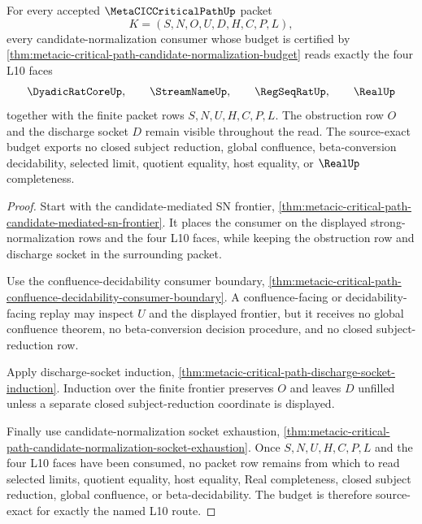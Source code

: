 \begin{theorem}
\label{thm:metacic-critical-path-candidate-normalization-l10-source-exactness}
For every accepted $\MetaCICCriticalPathUp$ packet
$$
K=(S,N,O,U,D,H,C,P,L),
$$
every candidate-normalization consumer whose budget is certified by \autoref{thm:metacic-critical-path-candidate-normalization-budget} reads exactly the four L10 faces
$$
\DyadicRatCoreUp,\qquad
\StreamNameUp,\qquad
\RegSeqRatUp,\qquad
\RealUp
$$
together with the finite packet rows $S,N,U,H,C,P,L$. The obstruction row $O$ and the discharge socket $D$ remain visible throughout the read. The source-exact budget exports no closed subject reduction, global confluence, beta-conversion decidability, selected limit, quotient equality, host equality, or $\RealUp$ completeness.
\end{theorem}
\begin{proof}
Start with the candidate-mediated SN frontier, \autoref{thm:metacic-critical-path-candidate-mediated-sn-frontier}. It places the consumer on the displayed strong-normalization rows and the four L10 faces, while keeping the obstruction row and discharge socket in the surrounding packet.

Use the confluence-decidability consumer boundary, \autoref{thm:metacic-critical-path-confluence-decidability-consumer-boundary}. A confluence-facing or decidability-facing replay may inspect $U$ and the displayed frontier, but it receives no global confluence theorem, no beta-conversion decision procedure, and no closed subject-reduction row.

Apply discharge-socket induction, \autoref{thm:metacic-critical-path-discharge-socket-induction}. Induction over the finite frontier preserves $O$ and leaves $D$ unfilled unless a separate closed subject-reduction coordinate is displayed.

Finally use candidate-normalization socket exhaustion, \autoref{thm:metacic-critical-path-candidate-normalization-socket-exhaustion}. Once $S,N,U,H,C,P,L$ and the four L10 faces have been consumed, no packet row remains from which to read selected limits, quotient equality, host equality, Real completeness, closed subject reduction, global confluence, or beta-decidability. The budget is therefore source-exact for exactly the named L10 route.
\end{proof}

